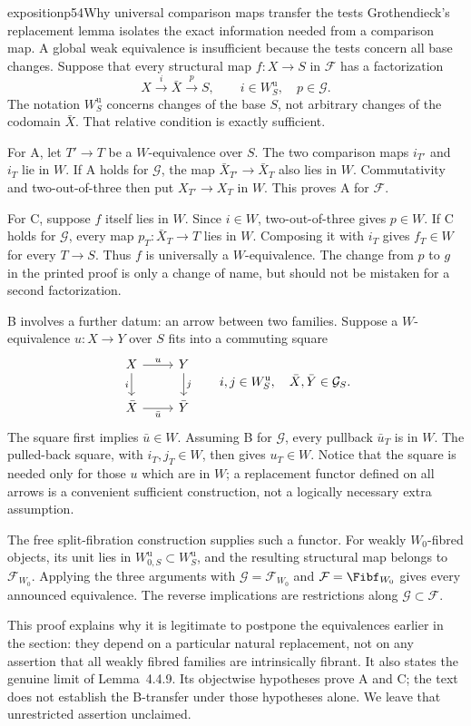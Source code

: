 \begin{dcomment}{exposition}{p54}{Why universal comparison maps transfer the tests}
Grothendieck's replacement lemma isolates the exact information needed from a comparison map. A global weak equivalence is insufficient because the tests concern all base changes. Suppose that every structural map $f:X\to S$ in $\mathcal F$ has a factorization
\[
 X\xrightarrow{\ i\ }\bar X\xrightarrow{\ p\ }S,
 \qquad i\in W_S^{\mathrm u},\quad p\in\mathcal G.
\]
The notation $W_S^{\mathrm u}$ concerns changes of the base $S$, not arbitrary changes of the codomain $\bar X$. That relative condition is exactly sufficient.

For A, let $T'\to T$ be a $W$-equivalence over $S$. The two comparison maps $i_{T'}$ and $i_T$ lie in $W$. If A holds for $\mathcal G$, the map $\bar X_{T'}\to\bar X_T$ also lies in $W$. Commutativity and two-out-of-three then put $X_{T'}\to X_T$ in $W$. This proves A for $\mathcal F$.

For C, suppose $f$ itself lies in $W$. Since $i\in W$, two-out-of-three gives $p\in W$. If C holds for $\mathcal G$, every map $p_T:\bar X_T\to T$ lies in $W$. Composing it with $i_T$ gives $f_T\in W$ for every $T\to S$. Thus $f$ is universally a $W$-equivalence. The change from $p$ to $g$ in the printed proof is only a change of name, but should not be mistaken for a second factorization.

B involves a further datum: an arrow between two families. Suppose a $W$-equivalence $u:X\to Y$ over $S$ fits into a commuting square
\[
\begin{tikzcd}
 X\arrow[r,"u"]\arrow[d,"i"']&Y\arrow[d,"j"]\\
 \bar X\arrow[r,"\bar u"']&\bar Y
\end{tikzcd}
\qquad
 i,j\in W_S^{\mathrm u},\quad \bar X,\bar Y\in\mathcal G_S.
\]
The square first implies $\bar u\in W$. Assuming B for $\mathcal G$, every pullback $\bar u_T$ is in $W$. The pulled-back square, with $i_T,j_T\in W$, then gives $u_T\in W$. Notice that the square is needed only for those $u$ which are in $W$; a replacement functor defined on all arrows is a convenient sufficient construction, not a logically necessary extra assumption.

The free split-fibration construction supplies such a functor. For weakly $W_0$-fibred objects, its unit lies in $W_{0,S}^{\mathrm u}\subset W_S^{\mathrm u}$, and the resulting structural map belongs to $\mathcal F_{W_0}$. Applying the three arguments with $\mathcal G=\mathcal F_{W_0}$ and $\mathcal F=\Fibf_{W_0}$ gives every announced equivalence. The reverse implications are restrictions along $\mathcal G\subset\mathcal F$.

This proof explains why it is legitimate to postpone the equivalences earlier in the section: they depend on a particular natural replacement, not on any assertion that all weakly fibred families are intrinsically fibrant. It also states the genuine limit of Lemma~4.4.9. Its objectwise hypotheses prove A and C; the text does not establish the B-transfer under those hypotheses alone. We leave that unrestricted assertion unclaimed.
\end{dcomment}

